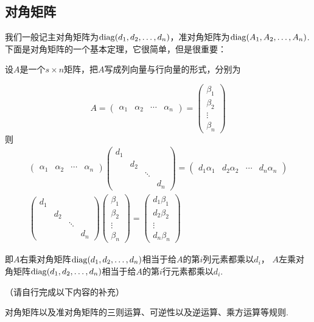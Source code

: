 \subsection{对角矩阵}
我们一般记主对角矩阵为$\operatorname{diag}(d_1,d_2,\dots,d_n)$，准对角矩阵为$\operatorname{diag}(A_1,A_2,\dots,A_n)$.
下面是对角矩阵的一个基本定理，它很简单，但是很重要：
\begin{theorem}
    设$A$是一个$s \times n$矩阵，把$A$写成列向量与行向量的形式，分别为

    \[ A = \begin{pmatrix}\alpha_1 & \alpha_2 & \cdots & \alpha_n\end{pmatrix} = \begin{pmatrix} \beta_1 \\ \beta_2 \\ \vdots \\ \beta_n \end{pmatrix} \]
    则
    \begin{gather*}
        \begin{pmatrix}\alpha_1 & \alpha_2 & \cdots & \alpha_n\end{pmatrix}
        \begin{pmatrix}
            d_1 & & & \\
            & d_2 & & \\
            & & \ddots & \\
            & & & d_n
        \end{pmatrix} = \begin{pmatrix}d_1\alpha_1 & d_2\alpha_2 & \cdots & d_n\alpha_n\end{pmatrix} \\
        \begin{pmatrix}
            d_1 & & & \\
            & d_2 & & \\
            & & \ddots & \\
            & & & d_n
        \end{pmatrix} \begin{pmatrix} \beta_1 \\ \beta_2 \\ \vdots \\ \beta_n \end{pmatrix} = \begin{pmatrix} d_1\beta_1 \\ d_2\beta_2 \\ \vdots \\ d_n\beta_n \end{pmatrix}
    \end{gather*}

    即$A$右乘对角矩阵$\operatorname{diag}(d_1,d_2,\ldots,d_n)$相当于给$A$的第$i$列元素都乘以$d_i$，
    $A$左乘对角矩阵$\operatorname{diag}(d_1,d_2,\ldots,d_n)$相当于给$A$的第$i$行元素都乘以$d_i$.
\end{theorem}
\begin{theorem}
    （请自行完成以下内容的补充）

    对角矩阵以及准对角矩阵的三则运算、可逆性以及逆运算、乘方运算等规则.
\end{theorem}

